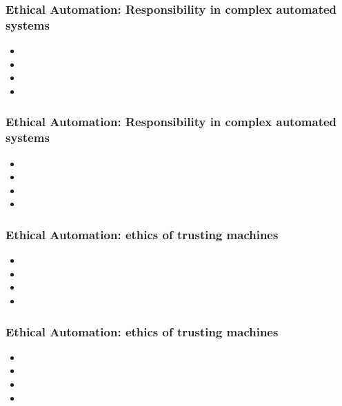\begin{frame}
    \frametitle{ Ethical Automation: Responsibility in complex automated systems }
    \begin{itemize}
	\item
    
     
	\item 
	  
	\item
		
   	 \item 
   	   
    \end{itemize}
\end{frame}
\begin{frame}
    \frametitle{ Ethical Automation: Responsibility in complex automated systems }
    \begin{itemize}
	\item
    
     
	\item 
	  
	\item
		
   	 \item 
   	   
    \end{itemize}
\end{frame}
\begin{frame}
    \frametitle{ Ethical Automation: ethics of trusting machines }
    \begin{itemize}
	\item
    
     
	\item 
	  
	\item
		
   	 \item 
   	   
    \end{itemize}
\end{frame}
\begin{frame}
    \frametitle{ Ethical Automation: ethics of trusting machines }
    \begin{itemize}
	\item
    
     
	\item 
	  
	\item
		
   	 \item 
   	   
    \end{itemize}
\end{frame}
